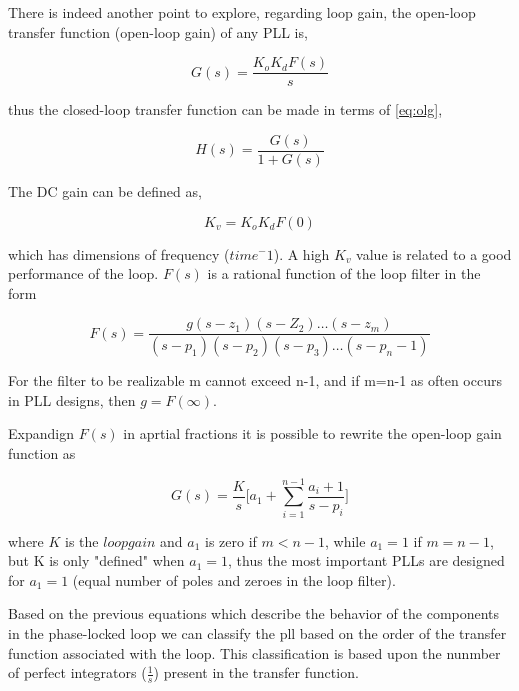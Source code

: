 There is indeed another point to explore, regarding loop gain, the open-loop
transfer function (open-loop gain) of any PLL is,

\begin{equation}
    G(s)=\frac{K_oK_dF(s)}{s}
    \label{eq:olg}
\end{equation}

thus the closed-loop transfer function can be made in terms of \ref{eq:olg},

\begin{equation}
    H(s)=\frac{G(s)}{1+G(s)}
    \label{eq:clg}
\end{equation}

The DC gain can be defined as,

\begin{equation}
    K_v=K_oK_dF(0)
    \label{eq:dcgain}
\end{equation}

which has dimensions of frequency ($time^-1$). A high $K_v$ value is related to
a good performance of the loop. $F(s)$ is a rational function of the loop filter
in the form

\begin{equation}
    F(s)=\frac{g(s -z_1)(s-Z_2)\dots(s-z_m)}
    {(s-p_1)(s-p_2)(s-p_3)\dots(s-p_n-1)}
    \label{eq:filterrf}
\end{equation}

For the filter to be realizable m cannot exceed n-1, and if m=n-1 as often
occurs in PLL designs, then $g=F(\infty)$.

Expandign $F(s)$ in aprtial fractions it is possible to rewrite the open-loop
gain function as

\begin{equation}
    G(s)=\frac{K}{s}\Bigg[ a_1+\sum_{i=1}^{n-1} \frac{a_i+1}{s-p_i}\Bigg]
    \label{eq:gsfilter}
\end{equation}

where $K$ is the $loop gain$  and $a_1$ is zero if $m < n-1$, while $a_1 = 1$ 
if $m = n-1$, but K is only "defined" when $a_1 = 1$, thus the most important
PLLs are designed for $a_1 = 1$ (equal number of poles and zeroes in the loop
filter).

Based on the previous equations which describe the behavior of the components in the
phase-locked loop we can classify the pll based on the order of the transfer
function associated with the loop. This classification is based upon the nunmber
of perfect integrators ($\frac{1}{s}$) present in the transfer function.

